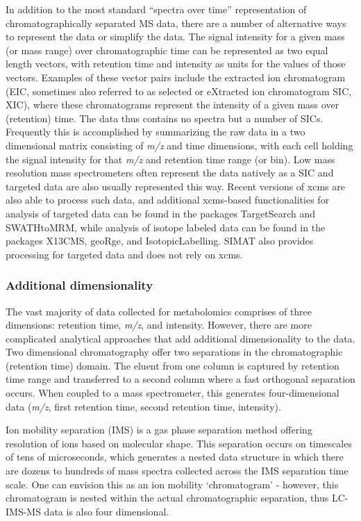 \documentclass[]{article}
\begin{document}
In addition to the most standard ``spectra over time'' representation of chromatographically separated MS data, there are a number of alternative ways to represent the data or simplify the data. The signal intensity for a given mass (or mass range) over chromatographic time can be represented as two equal length vectors, with retention time and intensity as units for the values of those vectors. Examples of these vector pairs include the extracted ion chromatogram (EIC, sometimes also referred to as selected or eXtracted ion chromatogram SIC, XIC), where these chromatograms represent the intensity of a given mass over (retention) time. The data thus contains no spectra but a number of SICs. Frequently this is accomplished by summarizing the raw data in a two dimensional matrix consisting of \emph{m/z} and time dimensions, with each cell holding the signal intensity for that \emph{m/z} and retention time range (or bin). Low mass resolution mass spectrometers often represent the data natively as a SIC and targeted data are also usually represented this way. Recent versions of xcms are also able to process such data, and additional xcms-based functionalities for analysis of targeted data can be found in the packages TargetSearch and SWATHtoMRM, while analysis of isotope labeled data can be found in the packages X13CMS, geoRge, and IsotopicLabelling. SIMAT also provides processing for targeted data and does not rely on xcms.

\hypertarget{additional-dimensionality}{%
\subsubsection{Additional dimensionality}\label{additional-dimensionality}}

The vast majority of data collected for metabolomics comprises of three dimensions: retention time, \emph{m/z}, and intensity. However, there are more complicated analytical approaches that add additional dimensionality to the data. Two dimensional chromatography offer two separations in the chromatographic (retention time) domain. The eluent from one column is captured by retention time range and transferred to a second column where a fast orthogonal separation occurs. When coupled to a mass spectrometer, this generates four-dimensional data (\emph{m/z}, first retention time, second retention time, intensity).

Ion mobility separation (IMS) is a gas phase separation method offering resolution of ions based on molecular shape. This separation occurs on timescales of tens of microseconds, which generates a nested data structure in which there are dozens to hundreds of mass spectra collected across the IMS separation time scale. One can envision this as an ion mobility `chromatogram' - however, this chromatogram is nested within the actual chromatographic separation, thus LC-IMS-MS data is also four dimensional.
\end{document}
